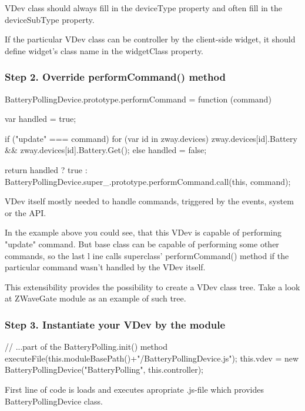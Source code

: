 VDev class should always fill in the deviceType property and often fill in the 
deviceSubType property.

If the particular VDev class can be controller by the client-side widget, it should define 
widget's class name in the widgetClass property.

\subsubsection{Step 2. Override performCommand() method}

\begin{listingverbatim}
BatteryPollingDevice.prototype.performCommand = function (command) {
    var handled = true;

    if ("update" === command) {
        for (var id in zway.devices) {
            zway.devices[id].Battery && zway.devices[id].Battery.Get();
        }
    } else {
        handled = false;
    }

    return handled ? true : 
    BatteryPollingDevice.super_.prototype.performCommand.call(this, command);
}
\end{listingverbatim}


VDev itself mostly needed to handle commands, triggered by the events, system or the API.

In the example above you could see, that this VDev is capable of performing "update" 
command. But base class can be capable of performing some other commands, so the last l
ine calls superclass' performCommand() method if the particular command wasn't handled 
by the VDev itself.

This extensibility provides the possibility to create a VDev class tree. Take a look at 
ZWaveGate module as an example of such tree.

\subsubsection{Step 3. Instantiate your VDev by the module}

\begin{listingverbatim}
// ...part of the BatteryPolling.init() method
executeFile(this.moduleBasePath()+"/BatteryPollingDevice.js");
this.vdev = new BatteryPollingDevice("BatteryPolling", this.controller);
\end{listingverbatim}

First line of code is loads and executes apropriate .js-file which provides 
BatteryPollingDevice class.

